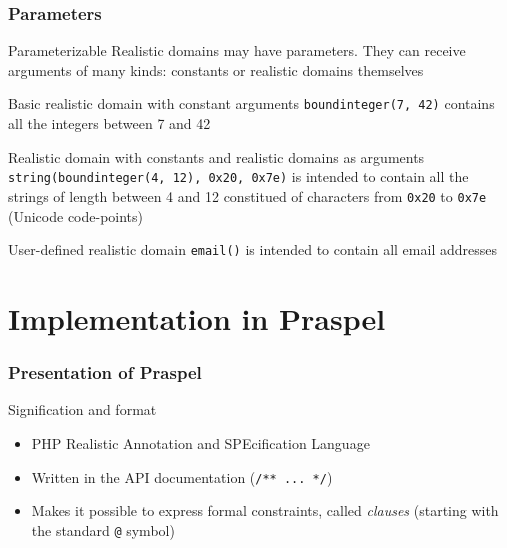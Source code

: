 \documentclass[10pt]{beamer}
\newcommand{\code}[1]{\texttt{#1}}
\newcommand{\outlinereminder}[0]{
  \frame{\frametitle{Outline}
  \tableofcontents[currentsection,subsectionstyle=show/show/hide]}
}
\begin{document}
\begin{frame}
\frametitle{Parameters}

\begin{block}{Parameterizable}
Realistic domains may have parameters. They can receive arguments of many kinds:
constants or realistic domains themselves
\end{block}

\begin{exampleblock}{Basic realistic domain with constant arguments}
\code{boundinteger(7, 42)} contains all the integers between 7 and 42
\end{exampleblock}

\begin{exampleblock}{Realistic domain with constants and realistic domains as
arguments}
\code{string(boundinteger(4, 12), 0x20, 0x7e)} is intended to contain all
the strings of length between 4 and 12 constitued of characters from \code{0x20}
to \code{0x7e} (Unicode code-points)
\end{exampleblock}

\begin{exampleblock}{User-defined realistic domain}
\code{email()} is intended to contain all email addresses
\end{exampleblock}

\end{frame}

\section{Implementation in Praspel}

\outlinereminder

\begin{frame}
\frametitle{Presentation of Praspel}

\begin{block}{Signification and format}
\begin{itemize}
\item PHP Realistic Annotation and SPEcification Language
\item Written in the API documentation (\code{/** ... */})
\item Makes it possible to express formal constraints, called {\em clauses}
(starting with the standard \code{@} symbol)
\end{itemize}
\end{block}

\end{frame}
\end{document}
